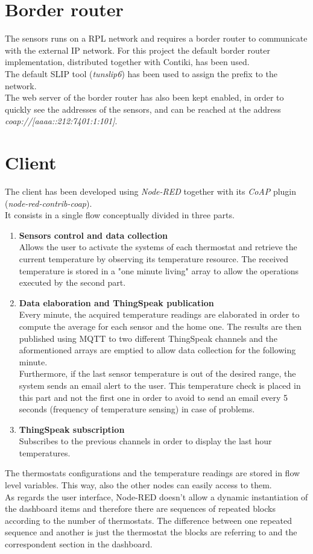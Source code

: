 \documentclass[12pt,a4paper]{report}
\begin{document}
\section*{Border router}
The sensors runs on a RPL network and requires a border router to communicate with the external IP network. For this project the default border router implementation, distributed together with Contiki, has been used.\\[8 pt]
The default SLIP tool (\textit{tunslip6}) has been used to assign the prefix to the network.\\[8pt]
The web server of the border router has also been kept enabled, in order to quickly see the addresses of the sensors, and can be reached at the address \textit{coap://[aaaa::212:7401:1:101]}.

\section*{Client}
The client has been developed using \textit{Node-RED} together with its \textit{CoAP} plugin (\textit{node-red-contrib-coap}).\\[8pt]
It consists in a single flow conceptually divided in three parts.
\begin{enumerate}
    \item \textbf{Sensors control and data collection}\\
    Allows the user to activate the systems of each thermostat and retrieve the current temperature by observing its temperature resource. The received temperature is stored in a "one minute living" array to allow the operations executed by the second part.
    \item \textbf{Data elaboration and ThingSpeak publication}\\
    Every minute, the acquired temperature readings are elaborated in order to compute the average for each sensor and the home one. The results are then published using MQTT to two different ThingSpeak channels and the aformentioned arrays are emptied to allow data collection for the following minute.\\
    Furthermore, if the last sensor temperature is out of the desired range, the system sends an email alert to the user. This temperature check is placed in this part and not the first one in order to avoid to send an email every 5 seconds (frequency of temperature sensing) in case of problems.
    \item \textbf{ThingSpeak subscription}\\
    Subscribes to the previous channels in order to display the last hour temperatures.
\end{enumerate}
The thermostats configurations and the temperature readings are stored in flow level variables. This way, also the other nodes can easily access to them.\\[8 pt]
As regards the user interface, Node-RED doesn't allow a dynamic instantiation of the dashboard items and therefore there are sequences of repeated blocks according to the number of thermostats. The difference between one repeated sequence and another is just the thermostat the blocks are referring to and the correspondent section in the dashboard.
\end{document}
